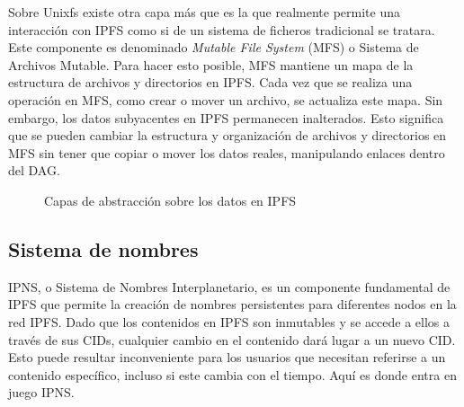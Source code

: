 Sobre Unixfs existe otra capa más que es la que realmente permite una interacción con IPFS como si de un
sistema de ficheros tradicional se tratara. Este componente es denominado \textit{Mutable File System} (MFS) o Sistema de Archivos Mutable.
Para hacer esto posible, MFS mantiene un mapa de la estructura de archivos y directorios en IPFS. Cada vez que se realiza una operación en MFS, como crear o mover
un archivo, se actualiza este mapa. Sin embargo, los datos subyacentes en IPFS permanecen inalterados. Esto significa que se pueden cambiar la estructura y
organización de archivos y directorios en MFS sin tener que copiar o mover los datos reales, manipulando enlaces dentro del DAG.
\begin{figure}[H]
      \vspace{10pt}
      \centering
      \caption{Capas de abstracción sobre los datos en IPFS}
      \label{fig:modelo-datos-ipfs}
\end{figure}


\subsection{Sistema de nombres}


IPNS, o Sistema de Nombres Interplanetario, es un componente fundamental de IPFS que permite la creación de nombres persistentes para diferentes
nodos en la red IPFS. Dado que los contenidos en IPFS son inmutables y se accede a ellos a través de sus CIDs,
cualquier cambio en el contenido dará lugar a un nuevo CID. Esto puede resultar inconveniente para los usuarios que necesitan referirse a un contenido
específico, incluso si este cambia con el tiempo. Aquí es donde entra en juego IPNS.

